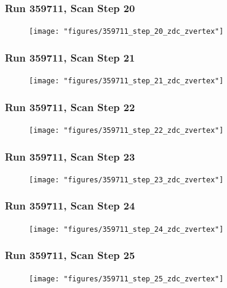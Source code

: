 \begin{frame}
\frametitle{Run 359711, Scan Step 20}
\begin{figure}
\begin{center}
\texttt{[image: "figures/359711\_step\_20\_zdc\_zvertex"]}
\caption{ }
\label{fig:359711_step_20_zdc_zvertex}
\end{center}\end{figure}
\end{frame}

\begin{frame}
\frametitle{Run 359711, Scan Step 21}
\begin{figure}
\begin{center}
\texttt{[image: "figures/359711\_step\_21\_zdc\_zvertex"]}
\caption{ }
\label{fig:359711_step_21_zdc_zvertex}
\end{center}\end{figure}
\end{frame}

\begin{frame}
\frametitle{Run 359711, Scan Step 22}
\begin{figure}
\begin{center}
\texttt{[image: "figures/359711\_step\_22\_zdc\_zvertex"]}
\caption{ }
\label{fig:359711_step_22_zdc_zvertex}
\end{center}\end{figure}
\end{frame}

\begin{frame}
\frametitle{Run 359711, Scan Step 23}
\begin{figure}
\begin{center}
\texttt{[image: "figures/359711\_step\_23\_zdc\_zvertex"]}
\caption{ }
\label{fig:359711_step_23_zdc_zvertex}
\end{center}\end{figure}
\end{frame}

\begin{frame}
\frametitle{Run 359711, Scan Step 24}
\begin{figure}
\begin{center}
\texttt{[image: "figures/359711\_step\_24\_zdc\_zvertex"]}
\caption{ }
\label{fig:359711_step_24_zdc_zvertex}
\end{center}\end{figure}
\end{frame}

\begin{frame}
\frametitle{Run 359711, Scan Step 25}
\begin{figure}
\begin{center}
\texttt{[image: "figures/359711\_step\_25\_zdc\_zvertex"]}
\caption{ }
\label{fig:359711_step_25_zdc_zvertex}
\end{center}\end{figure}
\end{frame}


